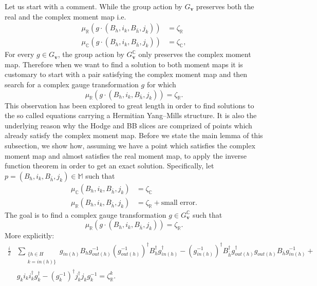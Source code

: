 \documentclass[12pt,oneside,reqno]{amsart}
\theoremstyle{definition}
\numberwithin{equation}{section}
\numberwithin{theorem}{section}
\newcommand{\R}{\mathbb{R}}
\newcommand{\C}{\mathbb{C}}
\begin{document}
Let us start with a comment. While the group action by $G_{\mathbf{v}}$ preserves both the real and the complex moment map i.e.
%
\begin{equation}
\begin{split}
\mu_{\R}(g\cdot(B_h,i_k,B_{\bar h}, j_k)) &= \zeta_{\R}\\
\mu_{\C}(g\cdot(B_h,i_k,B_{\bar h}, j_k)) &= \zeta_{\C},
\end{split}
\end{equation}
%
For every $g\in G_{\mathbf{v}}$, the group action by $G_{\mathbf{v}}^{\C}$ only preserves the complex moment map. Therefore when we want to find a solution to both moment maps it is customary to start with a pair satisfying the complex moment map and then search for a complex gauge transformation $g$ for which 
%
\begin{equation*}
\mu_{\R}(g\cdot(B_h,i_k,B_{\bar h}, j_k) )= \zeta_{\R}.
\end{equation*}
%
This observation has been explored to great length in order to find solutions to the so called equations carrying a Hermitian Yang--Mills structure. It is also the underlying reason why the Hodge and BB slices are comprized of points which already satisfy the complex moment map. 
Before we state the main lemma of this subsection, we show how, assuming we have a point which satisfies the complex moment map and almost satisfies the real moment map, to apply the inverse function theorem in order to get an exact solution.  Specifically, let $p = (B_h,i_k,B_{\bar h}, j_k)\in\mathbb M$ such that  
%
\begin{equation}
\begin{split}
\mu_{\C}(B_h,i_k,B_{\bar h}, j_k) &= \zeta_{\C}\\
\mu_{\R}(B_h,i_k,B_{\bar h}, j_k) &= \zeta_{\R} +\text{small error}.
\end{split}
\end{equation}
%
The goal is to find a complex gauge transformation $g\in G_{\mathbf{v}}^{ \C}$ such that 
%
\begin{equation}
\mu_{\R}(g\cdot(B_h,i_k,B_{\bar h}, j_k)) = \zeta_{\R}.
\end{equation}
%
More explicitly: 
%
\begin{equation}
\begin{split}
\frac{i}{2}&\sum\limits_{\substack{\{h\in H\\k=in(h)\}}} g_{in(h)}B_hg_{out(h)}^{-1}(g_{out(h)}^{-1})^{\dagger}B_h^{\dagger}g_{in(h)}^{\dagger} - (g_{in(h)}^{-1})^{\dagger}B_{\bar h}^{\dagger}g_{out(h)}^{\dagger}g_{out(h)}B_{\bar h}g_{in(h)}^{-1} +\\ &g_ki_ki_k^{\dagger}g_{k}^{\dagger} - (g_k^{-1})^{\dagger}j_k^{\dagger}j_kg_k^{-1} = \zeta_{\R}^k.
\end{split}
\end{equation}
\end{document}
